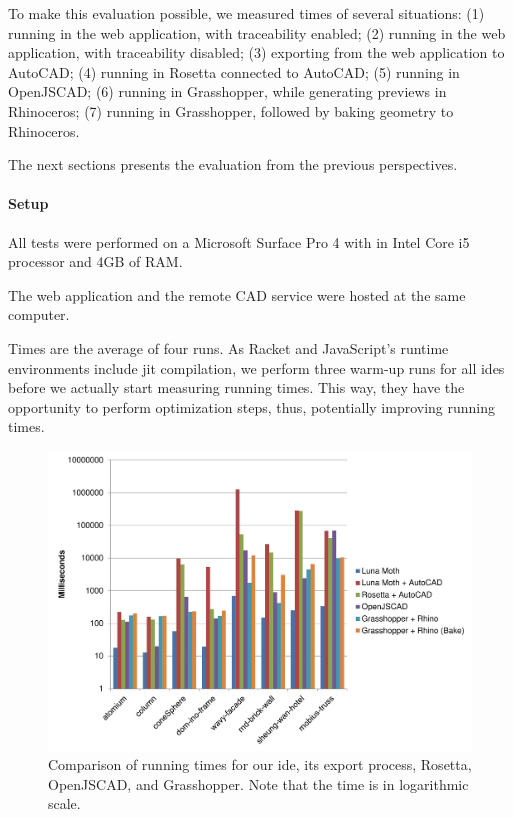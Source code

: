 To make this evaluation possible, we measured times of several situations:
(1) running in the web application, with traceability enabled;
(2) running in the web application, with traceability disabled;
(3) exporting from the web application to AutoCAD;
(4) running in Rosetta connected to AutoCAD;
(5) running in OpenJSCAD;
(6) running in Grasshopper, while generating previews in Rhinoceros;
(7) running in Grasshopper, followed by baking geometry to Rhinoceros.

The next sections presents the evaluation from the previous perspectives.

\paragraph{Setup}
All tests were performed on a Microsoft Surface Pro 4 with in Intel Core i5 processor and 4GB of RAM.

The web application and the remote CAD service were hosted at the same computer.

Times are the average of four runs.
As Racket and JavaScript's runtime environments include \gls{jit} compilation, we perform three warm-up runs for all \glspl{ide} before we actually start measuring running times.
This way, they have the opportunity to perform optimization steps, thus, potentially improving running times.

\begin{figure}
  \centering
  \includegraphics[width=1.0\textwidth]{./images/run_export_rosetta_times}
  \caption[Comparison of running times for our \gls{ide}, its export process, Rosetta, OpenJSCAD, and Grasshopper.]{Comparison of running times for our \gls{ide}, its export process, Rosetta, OpenJSCAD, and Grasshopper. Note that the time is in logarithmic scale.}
  \label{fig:run:export:rosetta:chart}
\end{figure}


